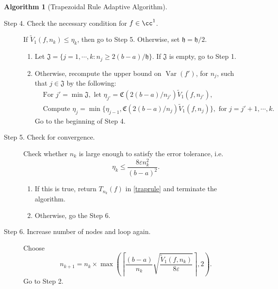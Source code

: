 \documentclass{iitthesis}
\DeclareMathOperator{\Var}{Var}
\theoremstyle{definition}
\newtheorem{algo}{Algorithm}
\theoremstyle{remark}
\begin{document}
\begin{algo}[Trapezoidal Rule Adaptive Algorithm]
\begin{description}
\item[Step 4. Check the necessary condition for $f \in \cc^1$.] If $\widetilde{V}_1(f,n_k) \le \eta_{k}$, then go to Step 5.
  Otherwise, set $\mathfrak{h} = \mathfrak{h}/2$.
    \begin{enumerate}[label=\alph*)]
      \item Let $\mathfrak{J}=\{j=1, \cdots, k: n_{j}\ge 2(b-a)/\mathfrak{h}\}$. If $\mathfrak{J}$ is empty, go to Step 1.
      \item Otherwise, recompute the upper bound on $\Var(f')$, for $n_{j}$, such that $j \in \mathfrak{J}$ by the following:
      \begin{align*}
        &\text{For } j'=\min\mathfrak{J}, \text{ let } \eta_{j'}=\mathfrak{C}(2(b-a)/n_{j'})\widetilde{V}_1(f,n_{j'}), \\
        &\text{Compute } \eta_{j}=\min\{\eta_{j-1},\mathfrak{C}(2(b-a)/n_{j})\widetilde{V}_1(f,n_{j})\}, \text{ for } j=j'+1, \cdots, k.
      \end{align*}
        Go to the beginning of Step 4.
    \end{enumerate}


\item[Step 5. Check for convergence.] Check whether $n_k$ is large enough to satisfy the error tolerance, i.e.
    \begin{equation*}
        \eta_{k} \le \frac{8\varepsilon n_k^2}{(b-a)^2}.
    \end{equation*}

    \begin{enumerate}[label=\alph*)]
      \item If this is true, return $T_{n_k}(f)$ in \eqref{traprule} and terminate the algorithm.
      \item Otherwise, go the Step 6.
    \end{enumerate}


\item[Step 6. Increase number of nodes and loop again.] Choose
$$
n_{k+1}=n_k\times\max\left(\left\lceil\frac{(b-a)}{n_{k}}\sqrt{\frac{\widetilde{V}_1(f,n_k)}{8\varepsilon}}\right\rceil,2\right).
$$
Go to Step 2.
\end{description}
\end{algo}
\end{document}
